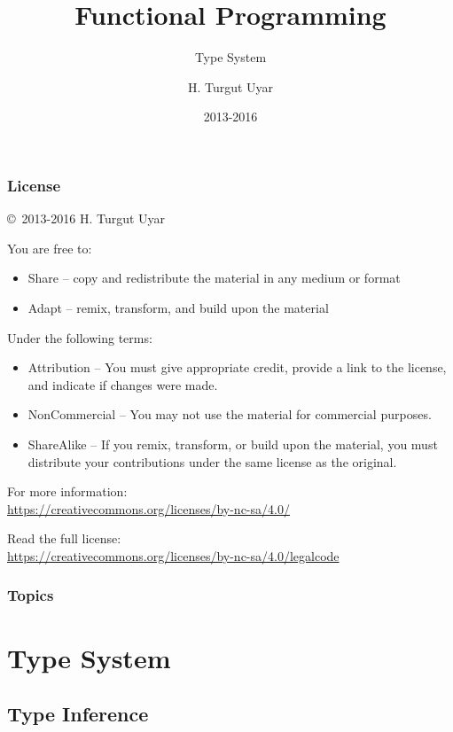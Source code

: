\documentclass[dvipsnames]{beamer}
\title{Functional Programming}
\subtitle{Type System}
\author{H. Turgut Uyar}
\date{2013-2016}
\theoremstyle{plain}
\begin{document}
\begin{frame}
  \titlepage
\end{frame}

\begin{frame}
  \frametitle{License}

  \hfill
  \copyright~2013-2016 H. Turgut Uyar

  \vfill
  \begin{footnotesize}
    You are free to:
    \begin{itemize}
      \itemsep0em
      \item Share -- copy and redistribute the material in any medium or format
      \item Adapt -- remix, transform, and build upon the material
    \end{itemize}

    Under the following terms:
    \begin{itemize}
      \itemsep0em
      \item Attribution -- You must give appropriate credit, provide a link to
        the license, and indicate if changes were made.

      \item NonCommercial -- You may not use the material for commercial
        purposes.

      \item ShareAlike -- If you remix, transform, or build upon the material,
        you must distribute your contributions under the same license as the
        original.
    \end{itemize}

    For more information:\\
    \url{https://creativecommons.org/licenses/by-nc-sa/4.0/}

    \smallskip
    Read the full license:\\
    \url{https://creativecommons.org/licenses/by-nc-sa/4.0/legalcode}
  \end{footnotesize}
\end{frame}

\begin{frame}
  \frametitle{Topics}
  \tableofcontents
\end{frame}

\section{Type System}

\subsection{Type Inference}
\end{document}
